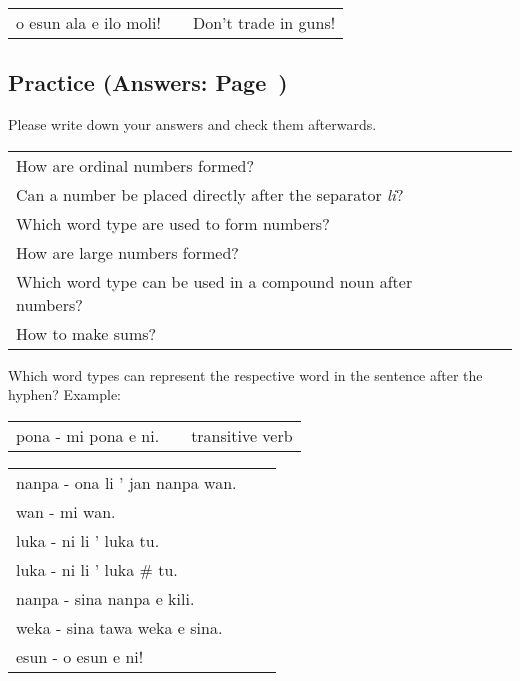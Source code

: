 \begin{supertabular}{p{5,5cm}|ll}
o esun ala e ilo moli! && Don't trade in guns! \\
\end{supertabular}

%
%
%
\newpage
%
\subsection*{Practice (Answers: Page~\pageref{'numbers'})}
%
Please write down your answers and check them afterwards. 

\begin{supertabular}{p{5,5cm}|ll}
How are ordinal numbers formed? &&   \\ %
Can a number be placed directly after the separator \textit{li}? &&  \\ %
Which word type are used to form numbers? &&  \\ %
How are large numbers formed? &&  \\ %
Which word type can be used in a compound noun after numbers? && \\ %
How to make sums? &&  \\ %
\end{supertabular} 

Which word types can represent the respective word in the sentence after the hyphen?
Example:

\begin{supertabular}{p{5,5cm}|ll}
pona - mi pona e ni. && transitive verb \\ %
\end{supertabular}

\begin{supertabular}{p{5,5cm}|ll}
nanpa - ona li ' jan nanpa wan. &&  \\ %
wan - mi wan. &&  \\ %
luka - ni li ' luka tu. && \\ %
luka - ni li ' luka # tu. &&  \\ %
nanpa - sina nanpa e kili. &&  \\ %
weka - sina tawa weka e sina. &&  \\ %
esun - o esun e ni! &&  \\ %
\end{supertabular}

